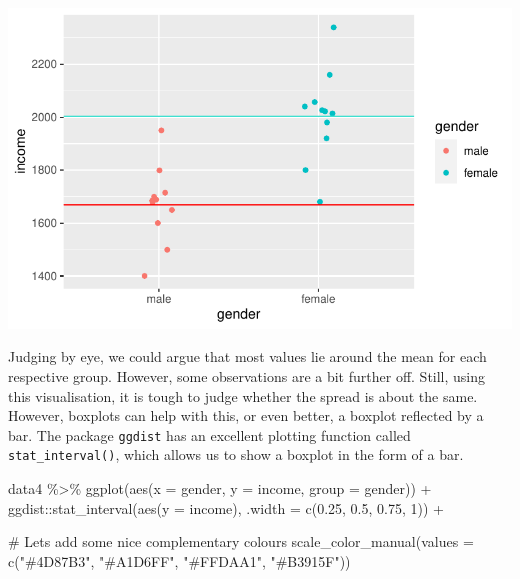 \documentclass[
  letterpaper,
]{krantz}
\makeatletter
\newenvironment{Shaded}{\begin{snugshade}}{\end{snugshade}}
\newcommand{\AttributeTok}[1]{\textcolor[rgb]{0.40,0.45,0.13}{#1}}
\newcommand{\CommentTok}[1]{\textcolor[rgb]{0.37,0.37,0.37}{#1}}
\newcommand{\DecValTok}[1]{\textcolor[rgb]{0.68,0.00,0.00}{#1}}
\newcommand{\FloatTok}[1]{\textcolor[rgb]{0.68,0.00,0.00}{#1}}
\newcommand{\FunctionTok}[1]{\textcolor[rgb]{0.28,0.35,0.67}{#1}}
\newcommand{\NormalTok}[1]{\textcolor[rgb]{0.00,0.23,0.31}{#1}}
\newcommand{\SpecialCharTok}[1]{\textcolor[rgb]{0.37,0.37,0.37}{#1}}
\newcommand{\StringTok}[1]{\textcolor[rgb]{0.13,0.47,0.30}{#1}}
\newenvironment{kframe}{%
\medskip{}
\setlength{\fboxsep}{.8em}
 \def\at@end@of@kframe{}%
 \ifinner\ifhmode%
  \def\at@end@of@kframe{\end{minipage}}%
  \begin{minipage}{\columnwidth}%
 \fi\fi%
 \def\FrameCommand##1{\hskip\@totalleftmargin \hskip-\fboxsep
 \colorbox{shadecolor}{##1}\hskip-\fboxsep
     \hskip-\linewidth \hskip-\@totalleftmargin \hskip\columnwidth}%
 \MakeFramed {\advance\hsize-\width
   \@totalleftmargin\z@ \linewidth\hsize
   \@setminipage}}%
 {\par\unskip\endMakeFramed%
 \at@end@of@kframe}
\renewenvironment{Shaded}{\begin{kframe}}{\end{kframe}}
\makeatother
\begin{document}
\includegraphics{09_sources_of_bias_files/figure-pdf/homogeneity-variance-1.pdf}

Judging by eye, we could argue that most values lie around the mean for
each respective group. However, some observations are a bit further off.
Still, using this visualisation, it is tough to judge whether the spread
is about the same. However, boxplots can help with this, or even better,
a boxplot reflected by a bar. The package \texttt{ggdist} has an
excellent plotting function called \texttt{stat\_interval()}, which
allows us to show a boxplot in the form of a bar.

\begin{Shaded}
\begin{Highlighting}[]
\NormalTok{data4 }\SpecialCharTok{\%\textgreater{}\%}
  \FunctionTok{ggplot}\NormalTok{(}\FunctionTok{aes}\NormalTok{(}\AttributeTok{x =}\NormalTok{ gender, }\AttributeTok{y =}\NormalTok{ income, }\AttributeTok{group =}\NormalTok{ gender)) }\SpecialCharTok{+}
\NormalTok{  ggdist}\SpecialCharTok{::}\FunctionTok{stat\_interval}\NormalTok{(}\FunctionTok{aes}\NormalTok{(}\AttributeTok{y =}\NormalTok{ income),}
                        \AttributeTok{.width =} \FunctionTok{c}\NormalTok{(}\FloatTok{0.25}\NormalTok{, }\FloatTok{0.5}\NormalTok{, }\FloatTok{0.75}\NormalTok{, }\DecValTok{1}\NormalTok{)) }\SpecialCharTok{+}

  \CommentTok{\# Let\textquotesingle{}s add some nice complementary colours}
  \FunctionTok{scale\_color\_manual}\NormalTok{(}\AttributeTok{values =} \FunctionTok{c}\NormalTok{(}\StringTok{"\#4D87B3"}\NormalTok{, }\StringTok{"\#A1D6FF"}\NormalTok{, }\StringTok{"\#FFDAA1"}\NormalTok{, }\StringTok{"\#B3915F"}\NormalTok{))}
\end{Highlighting}
\end{Shaded}
\end{document}
